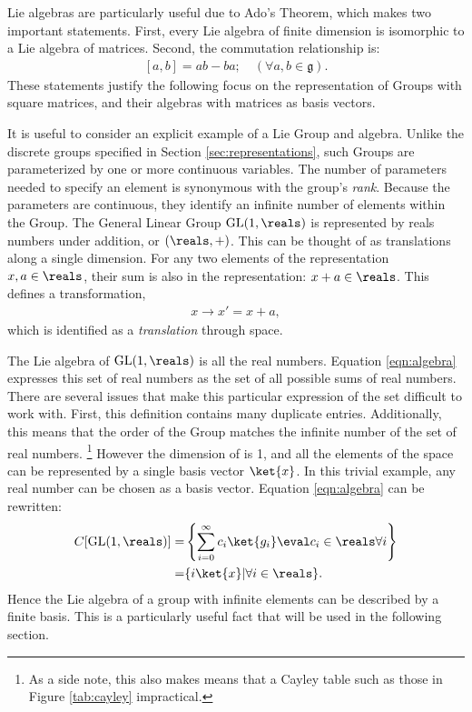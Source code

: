 Lie algebras are particularly useful due to Ado's Theorem, which makes two important statements. First, every Lie algebra of finite dimension is isomorphic to a Lie algebra of matrices. Second, the commutation relationship is:
\begin{equation}\begin{split}\label{eqn:commutator}
    [a,b]=ab-ba; \quad(\forall a,b\in\mathfrak{g}).
\end{split}\end{equation}
These statements justify the following focus on the representation of Groups with square matrices, and their algebras with matrices as basis vectors.

It is useful to consider an explicit example of a Lie Group and algebra.
Unlike the discrete groups specified in Section \ref{sec:representations}, such Groups are parameterized by one or more continuous variables.
The number of parameters needed to specify an element is synonymous with the group's \emph{rank}.
Because the parameters are continuous, they identify an infinite number of elements within the Group.
The General Linear Group $\text{GL}(1,\reals)$ is represented by reals numbers under addition, or $(\reals,+)$. \check
This can be thought of as translations along a single dimension. For any two elements of the representation $x,a\in\reals$, their sum
is also in the representation: $x+a\in\reals$. This defines a transformation,
\begin{equation}\begin{split}\label{eqn:simpleTransform}
    x\to x'=x+a,
\end{split}\end{equation} 
which is identified as a \emph{translation} through space.

The Lie algebra of $\text{GL}(1,\reals)$ is all the real numbers.
Equation \ref{eqn:algebra} expresses this set of real numbers as the set of all possible sums of real numbers.
There are several issues that make this particular expression of the set difficult to work with.
First, this definition contains many duplicate entries.
Additionally, this means that the order of the Group matches the infinite number of the set of real numbers.
\footnote{As a side note, this also makes means that a Cayley table such as those in Figure \ref{tab:cayley} impractical.}
However the dimension of \reals is 1, and all the elements of the space can be represented by a single basis vector $\ket{x}$.
In this trivial example, any real number can be chosen as a basis vector.
Equation \ref{eqn:algebra} can be rewritten:
\begin{equation}\begin{split}\label{eqn:algebra2}
    C[\text{GL}(1,\reals)]=&\left\{\sum_{i=0}^{\infty}c_i\ket{g_i}\eval c_i\in \reals \forall i\right\} \\
                          =&\{i\ket{x}|\forall i\in\reals\}.
\end{split}\end{equation}
Hence the Lie algebra of a group with infinite elements can be described by a finite basis.
This is a particularly useful fact that will be used in the following section.

